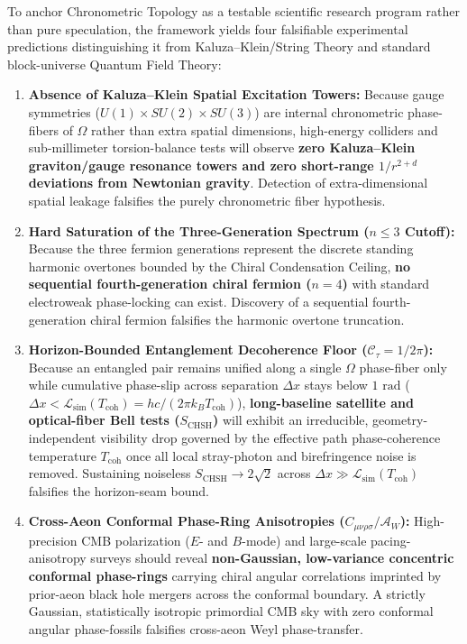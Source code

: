 \documentclass[
]{article}
\providecommand{\tightlist}{%
  \setlength{\itemsep}{0pt}\setlength{\parskip}{0pt}}
\begin{document}
To anchor Chronometric Topology as a testable scientific research
program rather than pure speculation, the framework yields four
falsifiable experimental predictions distinguishing it from
Kaluza--Klein/String Theory and standard block-universe Quantum Field
Theory:

\begin{enumerate}
\def\labelenumi{\arabic{enumi}.}
\tightlist
\item
  \textbf{Absence of Kaluza--Klein Spatial Excitation Towers:} Because
  gauge symmetries (\(U(1) \times SU(2) \times SU(3)\)) are internal
  chronometric phase-fibers of \(\Omega\) rather than extra spatial
  dimensions, high-energy colliders and sub-millimeter torsion-balance
  tests will observe \textbf{zero Kaluza--Klein graviton/gauge resonance
  towers and zero short-range \(1/r^{2+d}\) deviations from Newtonian
  gravity}. Detection of extra-dimensional spatial leakage falsifies the
  purely chronometric fiber hypothesis.
\item
  \textbf{Hard Saturation of the Three-Generation Spectrum (\(n \le 3\)
  Cutoff):} Because the three fermion generations represent the discrete
  standing harmonic overtones bounded by the Chiral Condensation
  Ceiling, \textbf{no sequential fourth-generation chiral fermion
  (\(n = 4\))} with standard electroweak phase-locking can exist.
  Discovery of a sequential fourth-generation chiral fermion falsifies
  the harmonic overtone truncation.
\item
  \textbf{Horizon-Bounded Entanglement Decoherence Floor
  (\(\mathcal{C}_\tau = 1/2\pi\)):} Because an entangled pair remains
  unified along a single \(\Omega\) phase-fiber only while cumulative
  phase-slip across separation \(\Delta x\) stays below \(1\text{ rad}\)
  (\(\Delta x < \mathcal{L}_{\text{sim}}(T_{\text{coh}}) = h c / (2\pi k_B T_{\text{coh}})\)),
  \textbf{long-baseline satellite and optical-fiber Bell tests
  (\(S_{\text{CHSH}}\))} will exhibit an irreducible,
  geometry-independent visibility drop governed by the effective path
  phase-coherence temperature \(T_{\text{coh}}\) once all local
  stray-photon and birefringence noise is removed. Sustaining noiseless
  \(S_{\text{CHSH}} \to 2\sqrt{2}\) across
  \(\Delta x \gg \mathcal{L}_{\text{sim}}(T_{\text{coh}})\) falsifies
  the horizon-seam bound.
\item
  \textbf{Cross-Aeon Conformal Phase-Ring Anisotropies
  (\(C_{\mu\nu\rho\sigma} / \mathcal{A}_W\)):} High-precision CMB
  polarization (\(E\)- and \(B\)-mode) and large-scale pacing-anisotropy
  surveys should reveal \textbf{non-Gaussian, low-variance concentric
  conformal phase-rings} carrying chiral angular correlations imprinted
  by prior-aeon black hole mergers across the conformal boundary. A
  strictly Gaussian, statistically isotropic primordial CMB sky with
  zero conformal angular phase-fossils falsifies cross-aeon Weyl
  phase-transfer.
\end{enumerate}
\end{document}
